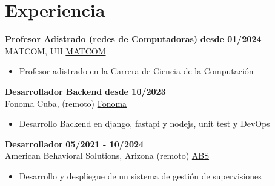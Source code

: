 \documentclass{article}
\begin{document}
\section*{Experiencia}
    \textbf{Profesor Adistrado (redes de Computadoras)} \hfill \textbf{desde 01/2024}\\ 
    MATCOM, UH
    \href{matcom.uh.cu}{MATCOM}
    \begin{itemize}
        \item Profesor adistrado en la Carrera de Ciencia de la Computación
    \end{itemize}

    \textbf{Desarrollador Backend} \hfill \textbf{desde 10/2023}\\ 
    Fonoma Cuba, (remoto)
    \href{fonoma.com}{Fonoma}
    \begin{itemize}
        \item Desarrollo Backend en django, fastapi y nodejs, unit test y DevOps
    \end{itemize}


    \textbf{Desarrollador} \hfill \textbf{05/2021 - 10/2024}\\ 
    American Behavioral Solutions, Arizona (remoto)
    \href{americanbehavioralsolutions.com}{ABS}
    \begin{itemize}
        \item Desarrollo y despliegue de un sistema de gestión de supervisiones
    \end{itemize}

\end{document}
